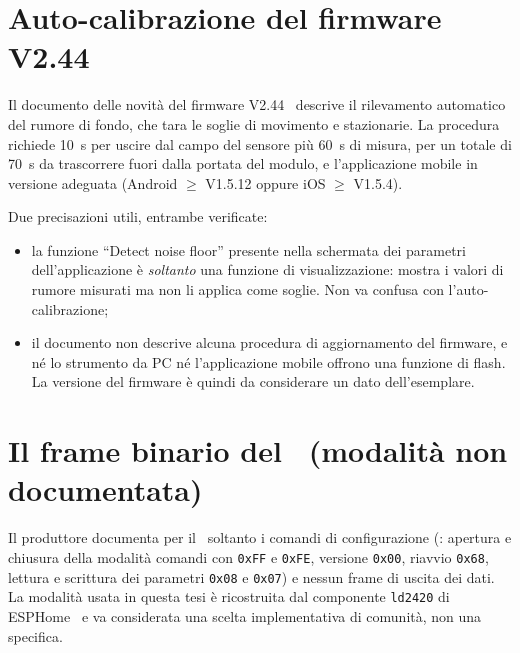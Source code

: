 \section{Auto-calibrazione del firmware V2.44}

Il documento delle novità del firmware V2.44~\cite{hilinkV244} descrive il
rilevamento automatico del rumore di fondo, che tara le soglie di movimento e
stazionarie. La procedura richiede 10~s per uscire dal campo del sensore più 60~s di
misura, per un totale di 70~s da trascorrere fuori dalla portata del modulo, e
l'applicazione mobile in versione adeguata (Android $\geq$ V1.5.12 oppure
iOS $\geq$ V1.5.4).

Due precisazioni utili, entrambe verificate:

\begin{itemize}[leftmargin=1.4em,itemsep=2pt]
  \item la funzione ``Detect noise floor'' presente nella schermata dei parametri
        dell'applicazione è \emph{soltanto} una funzione di visualizzazione: mostra i
        valori di rumore misurati ma non li applica come soglie. Non va confusa con
        l'auto-calibrazione;
  \item il documento non descrive alcuna procedura di aggiornamento del firmware, e
        né lo strumento da PC né l'applicazione mobile offrono una funzione di flash.
        La versione del firmware è quindi da considerare un dato dell'esemplare.
\end{itemize}

\section{Il frame binario del \ldc\ (modalità non documentata)}
\label{app:ld2420-frame}

Il produttore documenta per il \ldc\ soltanto i comandi di configurazione
(\cite{hilinkProtoLD2420}: apertura e chiusura della modalità comandi con
\texttt{0xFF} e \texttt{0xFE}, versione \texttt{0x00}, riavvio \texttt{0x68},
lettura e scrittura dei parametri \texttt{0x08} e \texttt{0x07}) e nessun frame di
uscita dei dati. La modalità usata in questa tesi è ricostruita dal componente
\texttt{ld2420} di ESPHome~\cite{esphomeLD2420src} e va considerata una scelta
implementativa di comunità, non una specifica.


